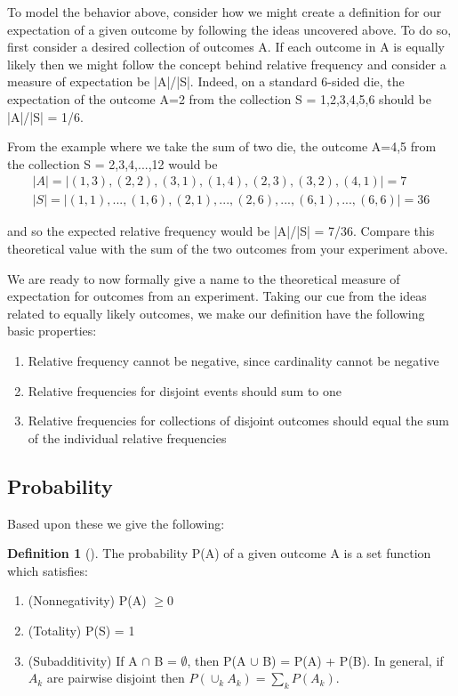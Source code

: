 \documentclass[10pt,]{book}
\theoremstyle{plain}
\theoremstyle{definition}
\newtheorem{definition}[theorem]{Definition}
\theoremstyle{definition}
\theoremstyle{definition}
\numberwithin{equation}{section}
\begin{document}
		To model the behavior above, consider how we might create a definition for our expectation
		of a given outcome by following the ideas uncovered above. To do so, first consider a desired collection
		of outcomes A. If each outcome in A is equally likely then we might follow the concept behind relative 
		frequency and consider a measure of expectation be |A|/|S|. Indeed, on a standard 
		6-sided die, the expectation of the outcome A={2} from the collection S = {1,2,3,4,5,6} should be
		|A|/|S| = 1/6.%
\par
From the example where we take the sum of two die, the outcome A={4,5} from the
		collection S = {2,3,4,...,12} would be%
\begin{gather*}
|A| = | {(1,3),(2,2),(3,1),(1,4),(2,3),(3,2),(4,1)}| = 7\\
|S| = | {(1,1),...,(1,6),(2,1),...,(2,6),...,(6,1),...,(6,6)}| = 36
\end{gather*}\par
and so the expected relative frequency would be |A|/|S| = 7/36. Compare this theoretical value
		with the sum of the two outcomes from your experiment above.%
\par
We are ready to now formally give a name to the theoretical measure of expectation for
		outcomes from an experiment. Taking our cue from the ideas related to equally likely outcomes, we 
		make our definition have the following basic properties:%
\leavevmode%
\begin{enumerate}
\item\hypertarget{li-105}{}Relative frequency cannot be negative, since cardinality cannot be negative%
\item\hypertarget{li-106}{}Relative frequencies for disjoint events should sum to one%
\item\hypertarget{li-107}{}Relative frequencies for collections of disjoint outcomes should equal the sum of the
		individual relative frequencies%
\end{enumerate}
\typeout{************************************************}
\typeout{************************************************}
\subsection[Probability]{Probability}\label{subsection-9}
Based upon these we give the following:%
\begin{definition}[]\label{DefnProb}
The probability P(A) of a given outcome A is a set function which satisfies:
			\leavevmode%
\begin{enumerate}
\item\hypertarget{li-108}{}(Nonnegativity) P(A) \(\ge 0\)%
\item\hypertarget{li-109}{}(Totality) P(S) = 1%
\item\hypertarget{li-110}{}(Subadditivity) If A \(\cap\) B = \(\emptyset\), then P(A \(\cup\) B) = P(A) + P(B).  
				In general, if {\(A_k\)} are pairwise disjoint then \(P( \cup_k A_k) = \sum_k P(A_k)\).%
\end{enumerate}
\end{definition}
\typeout{************************************************}
\typeout{************************************************}
\end{document}
